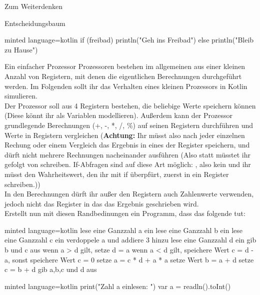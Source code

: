 \begin{task}[points=auto]{Zum Weiterdenken }
\begin{subtask*}[points=0]{Entscheidungsbaum}
\begin{solution}
\begin{codeBlock}[]{minted language=kotlin}
                if (freibad) {
                    println("Geh ins Freibad")
                } else {
                    println("Bleib zu Hause")
                }
            \end{codeBlock}
        \end{solution}
    \end{subtask*}
    \begin{subtask*}[points=0]{Ein einfacher Prozessor}
        Prozessoren bestehen im allgemeinen aus einer kleinen Anzahl von Registern, mit denen die eigentlichen Berechnungen durchgeführt werden. Im Folgenden sollt ihr das Verhalten eines kleinen Prozessors in Kotlin simulieren. \\
        Der Prozessor soll aus 4 Registern bestehen, die beliebige Werte speichern können (Diese könnt ihr als Variablen modellieren). Außerdem kann der Prozessor grundlegende Berechnungen ({\ttfamily +, -, *, /, \%}) auf seinen Registern durchführen und Werte in Registern vergleichen (\textbf{Achtung:} Ihr müsst also nach jeder einzelnen Rechung oder einem Vergleich das Ergebnis in eines der Register speichern, und dürft nicht mehrere Rechnungen nacheinander ausführen (Also statt  müsstet ihr  gefolgt von  schreiben. If-Abfragen sind auf diese Art möglich: , also kein  und ihr müsst den Wahrheitswert, den ihr mit if überpfürt, zuerst in ein Register schreiben.)) \\
        In den Berechnungen dürft ihr außer den Registern auch Zahlenwerte verwenden, jedoch nicht das Register in das das Ergebnis geschrieben wird.\\
        Erstellt nun mit diesen Randbedinungen ein Programm, dass das folgende tut: \\
        \begin{codeBlock}[]{minted language=kotlin}
            lese eine Ganzzahl a ein
            lese eine Ganzzahl b ein
            lese eine Ganzzahl c ein
            verdoppele a und addiere 3 hinzu
            lese eine Ganzzahl d ein
            gib b und c aus
            wenn a > d gilt, setze d = a
            wenn a < d gilt, speichere Wert c = d - a, sonst speichere Wert c = 0
            setze a = c * d + a * a
            setze Wert b = a + d
            setze c = b + d
            gib a,b,c und d aus
        \end{codeBlock}

        \begin{solution}
            \begin{codeBlock}[]{minted language=kotlin}
                print("Zahl a einlesen: ")
                var a = readln().toInt()


\end{codeBlock}
\end{solution}
\end{subtask*}
\end{task}
